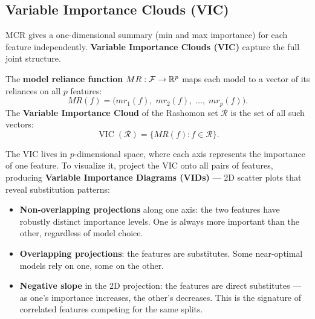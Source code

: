 \subsection{Variable Importance Clouds (VIC)}\label{sec:rashomon:vic}

MCR gives a one-dimensional summary (min and max importance) for each
feature independently.  \textbf{Variable Importance Clouds (VIC)}
\citep{DongRudin2020} capture the full joint structure.

\begin{definition}
The \textbf{model reliance function} $MR : \mathcal{F} \to \mathbb{R}^p$ maps each
model to a vector of its reliances on all $p$ features:
\[
  MR(f) = \bigl(mr_1(f),\; mr_2(f),\; \ldots,\; mr_p(f)\bigr).
\]
The \textbf{Variable Importance Cloud} of the Rashomon set $\mathcal{R}$ is
the set of all such vectors:
\begin{equation}\label{eq:vic}
  \operatorname{VIC}(\mathcal{R}) = \bigl\{MR(f) : f \in \mathcal{R}\bigr\}.
\end{equation}
\end{definition}

The VIC lives in $p$-dimensional space, where each axis represents the
importance of one feature.  To visualize it, \citet{DongRudin2020} project
the VIC onto all pairs of features, producing \textbf{Variable Importance
Diagrams (VIDs)} --- 2D scatter plots that reveal substitution patterns:

\begin{itemize}[leftmargin=1.8em]
  \item \textbf{Non-overlapping projections} along one axis: the two
    features have robustly distinct importance levels.  One is always more
    important than the other, regardless of model choice.
  \item \textbf{Overlapping projections}: the features are substitutes.
    Some near-optimal models rely on one, some on the other.
  \item \textbf{Negative slope} in the 2D projection: the features are
    direct substitutes --- as one's importance increases, the other's
    decreases.  This is the signature of correlated features competing for
    the same splits.
\end{itemize}

